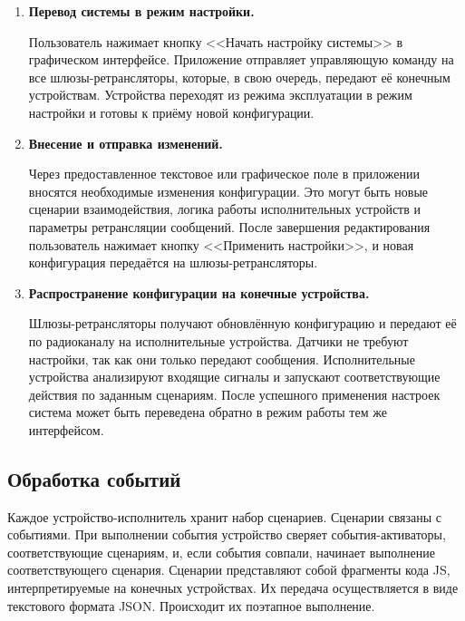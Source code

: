 \documentclass[a4paper,12pt]{article}
\begin{document}
\begin{enumerate}[label=\textbf{\arabic*.}]
    \item \textbf{Перевод системы в режим настройки.} 
    
    Пользователь нажимает кнопку <<Начать настройку системы>> в графическом интерфейсе. Приложение отправляет управляющую команду на все шлюзы-ретрансляторы, которые, в свою очередь, передают её конечным устройствам. Устройства переходят из режима эксплуатации в режим настройки и готовы к приёму новой конфигурации.
    
    \item \textbf{Внесение и отправка изменений.} 
    
    Через предоставленное текстовое или графическое поле в приложении вносятся необходимые изменения конфигурации. Это могут быть новые сценарии взаимодействия, логика работы исполнительных устройств и параметры ретрансляции сообщений. После завершения редактирования пользователь нажимает кнопку <<Применить настройки>>, и новая конфигурация передаётся на шлюзы-ретрансляторы.
    
    \item \textbf{Распространение конфигурации на конечные устройства.} 
    
    Шлюзы-ретрансляторы получают обновлённую конфигурацию и передают её по радиоканалу на исполнительные устройства. Датчики не требуют настройки, так как они только передают сообщения. Исполнительные устройства анализируют входящие сигналы и запускают соответствующие действия по заданным сценариям. После успешного применения настроек система может быть переведена обратно в режим работы тем же интерфейсом.
\end{enumerate}





\subsection{Обработка событий}
Каждое устройство-исполнитель хранит набор сценариев. Сценарии связаны с событиями. При выполнении события устройство сверяет события-активаторы, соответствующие сценариям, и, если события совпали, начинает выполнение соответствующего сценария. Сценарии представляют собой фрагменты кода JS, интерпретируемые на конечных устройствах. Их передача осуществляется в виде текстового формата JSON. Происходит их поэтапное выполнение.
\end{document}
